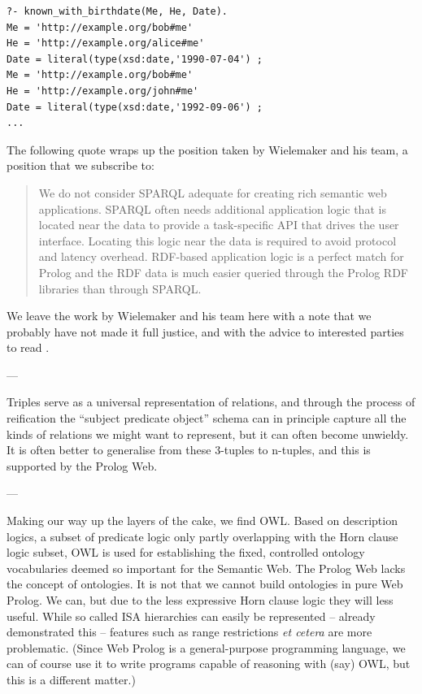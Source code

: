 \documentclass{tlp}
\begin{document}
\begin{lstlisting}
?- known_with_birthdate(Me, He, Date).
Me = 'http://example.org/bob#me'
He = 'http://example.org/alice#me'
Date = literal(type(xsd:date,'1990-07-04') ;
Me = 'http://example.org/bob#me'
He = 'http://example.org/john#me'
Date = literal(type(xsd:date,'1992-09-06') ;
...
\end{lstlisting}

\noindent The following quote wraps up the position taken by Wielemaker and his team, a position that we subscribe to:

\begin{quote}
We do not consider SPARQL adequate for creating rich semantic web applications. SPARQL often needs additional application logic that is located near the data to provide a task-specific API that drives the user interface. Locating this logic near the data is required to avoid protocol and latency overhead. RDF-based application logic is a perfect match for Prolog and the RDF data is much easier queried through the Prolog RDF libraries than through SPARQL.
\end{quote}

\noindent We leave the work by Wielemaker and his team here with a note that we probably have not made it full justice, and with the advice to interested parties to read \cite{wielemaker2016cliopatria}.


---

Triples serve as a universal representation of relations, and through the process of reification the ``subject predicate object'' schema can in principle capture all the kinds of relations we might want to represent, but it can often become unwieldy. It is often better to generalise from these 3-tuples to n-tuples, and this is supported by the Prolog Web.

---

Making our way up the layers of the cake, we find OWL. Based on description logics, a subset of predicate logic only partly overlapping with the Horn clause logic subset, OWL is used for establishing the fixed, controlled ontology vocabularies deemed so important for the Semantic Web. The Prolog Web lacks the concept of ontologies. It is not that we cannot build ontologies in pure Web Prolog. We can, but due to the less expressive Horn clause logic they will less useful. While so called ISA hierarchies can easily be represented -- already \cite{deliyanni1979logic} demonstrated this -- features such as range restrictions \textit{et cetera} are more problematic. (Since Web Prolog is a general-purpose programming language, we can of course use it to write programs capable of reasoning with (say) OWL, but this is a different matter.)
\end{document}
